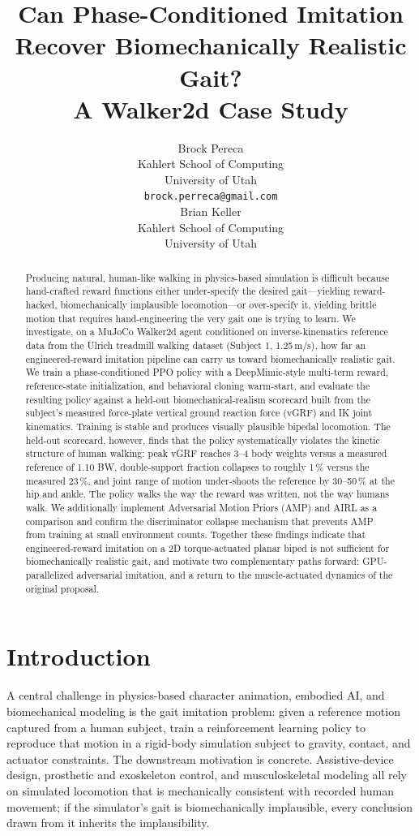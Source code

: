\documentclass{article}
\title{Can Phase-Conditioned Imitation Recover Biomechanically Realistic Gait? \\ A Walker2d Case Study}
\author{%
  Brock Pereca \\
  Kahlert School of Computing \\
  University of Utah \\
  \texttt{brock.perreca@gmail.com} \\
  \And
  Brian Keller \\
  Kahlert School of Computing \\
  University of Utah \\
}
\begin{document}
\maketitle

\begin{abstract}
Producing natural, human-like walking in physics-based simulation is difficult because hand-crafted reward functions either under-specify the desired gait---yielding reward-hacked, biomechanically implausible locomotion---or over-specify it, yielding brittle motion that requires hand-engineering the very gait one is trying to learn. We investigate, on a MuJoCo Walker2d agent conditioned on inverse-kinematics reference data from the Ulrich treadmill walking dataset (Subject 1, 1.25\,m/s), how far an engineered-reward imitation pipeline can carry us toward biomechanically realistic gait. We train a phase-conditioned PPO policy with a DeepMimic-style multi-term reward, reference-state initialization, and behavioral cloning warm-start, and evaluate the resulting policy against a held-out biomechanical-realism scorecard built from the subject's measured force-plate vertical ground reaction force (vGRF) and IK joint kinematics. Training is stable and produces visually plausible bipedal locomotion. The held-out scorecard, however, finds that the policy systematically violates the kinetic structure of human walking: peak vGRF reaches 3--4 body weights versus a measured reference of 1.10 BW, double-support fraction collapses to roughly 1\,\% versus the measured 23\,\%, and joint range of motion under-shoots the reference by 30--50\,\% at the hip and ankle. The policy walks the way the reward was written, not the way humans walk. We additionally implement Adversarial Motion Priors (AMP) and AIRL as a comparison and confirm the discriminator collapse mechanism that prevents AMP from training at small environment counts. Together these findings indicate that engineered-reward imitation on a 2D torque-actuated planar biped is not sufficient for biomechanically realistic gait, and motivate two complementary paths forward: GPU-parallelized adversarial imitation, and a return to the muscle-actuated dynamics of the original proposal.
\end{abstract}

\section{Introduction}

A central challenge in physics-based character animation, embodied AI, and biomechanical modeling is the gait imitation problem: given a reference motion captured from a human subject, train a reinforcement learning policy to reproduce that motion in a rigid-body simulation subject to gravity, contact, and actuator constraints. The downstream motivation is concrete. Assistive-device design, prosthetic and exoskeleton control, and musculoskeletal modeling all rely on simulated locomotion that is mechanically consistent with recorded human movement; if the simulator's gait is biomechanically implausible, every conclusion drawn from it inherits the implausibility.
\end{document}

